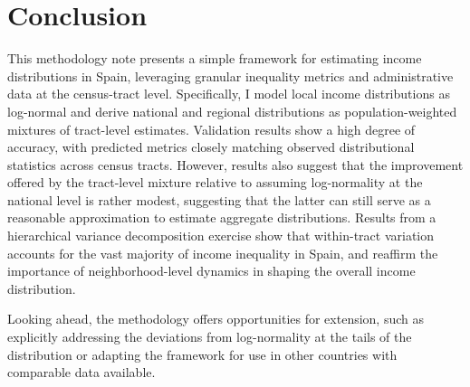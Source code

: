 \documentclass[letterpaper,11pt,leqno]{article}
\begin{document}


\section{Conclusion}\label{sec:conc}

This methodology note presents a simple framework for estimating income distributions in Spain, leveraging granular inequality metrics and administrative data at the census-tract level. Specifically, I model local income distributions as log-normal and derive national and regional distributions as population-weighted mixtures of tract-level estimates. Validation results show a high degree of accuracy, with predicted metrics closely matching observed distributional statistics across census tracts. However, results also suggest that the improvement offered by the tract-level mixture relative to assuming log-normality at the national level is rather modest, suggesting that the latter can still serve as a reasonable approximation to estimate aggregate distributions. Results from a hierarchical variance decomposition exercise show that within-tract variation accounts for the vast majority of income inequality in Spain, and reaffirm the importance of neighborhood-level dynamics in shaping the overall income distribution.

Looking ahead, the methodology offers opportunities for extension, such as explicitly addressing the deviations from log-normality at the tails of the distribution or adapting the framework for use in other countries with comparable data available. 

\newpage
\singlespacing


\end{document}
